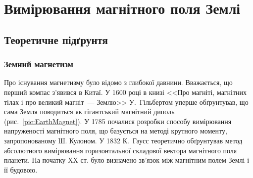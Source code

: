 
%
\expandafter\graphicspath\expandafter{\expandafter{\currfilebase/pic}}
\usetikzlibrary{arrows.meta}




\chapter{Вимірювання магнітного поля Землі}
\makeworktitle



\section{Теоретичне підґрунтя}

\subsection{Земний магнетизм}

Про існування магнетизму було відомо з глибокої давнини. Вважається, що перший компас з'явився в Китаї. У 1600 році в книзі <<Про магніті, магнітних тілах і про великий магніт~--- Землю>> У.~Гільбертом  уперше обґрунтував, що сама Земля поводиться як гігантський магнітний диполь (рис.~\ref{pic:EarthMagnet}). У 1785 почалися розробки способу вимірювання напруженості магнітного поля, що базується на методі крутного моменту, запропонованому Ш. Кулоном. У 1832 К.~Гаусс теоретично обґрунтував метод абсолютного вимірювання горизонтальної складової вектора магнітного поля планети. На початку XX ст. було визначено зв'язок між магнітним полем Землі і її будовою.

